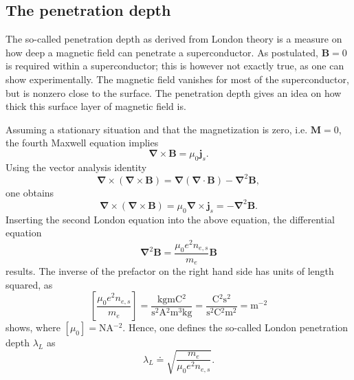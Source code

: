 \documentclass{report}
\numberwithin{tm}{section}
\newcommand\vect[1]{\ensuremath{\bm{#1}}}
\begin{document}
\subsection{The penetration depth}
The so-called penetration depth as derived from London theory is a measure on how deep a magnetic field can penetrate a superconductor. As postulated, $\vect{B} =0$ is required within a superconductor; this is however not exactly true, as one can show experimentally. The magnetic field vanishes for most of the superconductor, but is nonzero close to the surface. The penetration depth gives an idea on how thick this surface layer of magnetic field is.

Assuming a stationary situation and that the magnetization is zero, i.e. $\vect{M} = 0$, the fourth Maxwell equation implies \begin{equation}
	\vect{\nabla} \times \vect{B} = \mu_0 \vect{j}_s.
\end{equation} Using the vector analysis identity \begin{equation}\label{eq:vectoranalysisidentity}
\vect{\nabla} \times (\vect{\nabla} \times \vect{B}) = \vect{\nabla}(\vect{\nabla} \cdot \vect{B}) - \vect{\nabla}^2\vect{B},
\end{equation} one obtains
\begin{equation}
	\vect{\nabla} \times (\vect{\nabla} \times \vect{B}) = \mu_0\vect{\nabla}\times  \vect{j}_s =  - \vect{\nabla}^2\vect{B}.
\end{equation} Inserting the second London equation into the above equation, the differential equation \begin{equation}
\vect{\nabla}^2\vect{B} = \frac{\mu_0e^2n_{e,s}}{m_e}\vect{B}
\end{equation} results. The inverse of the prefactor on the right hand side has units of length squared, as \begin{equation}
\left[\frac{\mu_0e^2n_{e,s}}{m_e}\right] = \frac{\si{\kilogram\meter\coulomb^2}}{\si{\second^2\ampere^2\meter^3\kilogram}} = \frac{\si{\coulomb^2\second^2}}{\si{\second^2\coulomb^2\meter^2}} = \si{\meter^{-2}}
\end{equation} shows, where $[\mu_0] = \si{\newton\ampere^{-2}}$. Hence, one defines the so-called London penetration depth $\lambda_L$ as
\begin{equation}
	\lambda_L \doteq \sqrt{\frac{m_e}{\mu_0e^2n_{e,s}}}.
\end{equation}
\end{document}
